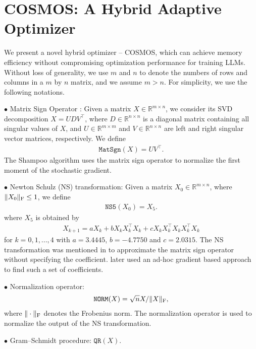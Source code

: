 \newcommand{\RR}{\mathbb{R}}
\section{COSMOS: A Hybrid Adaptive Optimizer}

We present a novel hybrid optimizer -- COSMOS, which can achieve memory efficiency without compromising optimization performance for training LLMs. Without loss of generality, we use $m$ and $n$ to denote the numbers of rows and columns in a $m$ by $n$ matrix, and we assume $m>n$. For simplicity, we use the following notations.

\vskip2pt
\noindent $\bullet$ Matrix Sign Operator \citep{roberts1980linear}: Given a matrix $X\in\RR^{m \times n}$, we consider its SVD decomposition $X=UDV^\top$, where $D\in\RR^{n\times n}$ is a diagonal matrix containing all singular values of $X$, and $U\in\RR^{m\times m}$ and $V\in\RR^{n \times n}$ are left and right singular vector matrices, respectively. We define
\begin{align*}
\texttt{MatSgn}(X) = UV^\top. 
\end{align*}
The Shampoo algorithm uses the matrix sign operator to normalize the first moment of the stochastic gradient.

\vskip2pt
\noindent $\bullet$ Newton Schulz (NS) transformation: Given a matrix $X_0\in\RR^{m \times n}$, where $\|X_0\|_{\rm F}\leq 1$, we define
\begin{align*}
\texttt{NS5}(X_0)=X_5.
\end{align*}
where $X_5$ is obtained by
\begin{align*}
X_{k+1}=aX_{k}+bX_{k}X_{k}^\top X_{k}+cX_{k}X_{k}^\top X_{k}X_{k}^\top X_{k}
\end{align*}
for $k=0,1,...,4$ with $a=3.4445$, $b=-4.7750$ and $c=2.0315$. The NS transformation was mentioned in \citet{bernstein2024modular} to approximate the matrix sign operator without specifying the coefficient. \citet{jordan2024MUON} later used an ad-hoc gradient based approach to find such a set of coefficients.

\vskip2pt
\noindent $\bullet$ Normalization operator:
\begin{align}\label{new-norm}
\texttt{NORM}(X) = \sqrt{n}X/\|X\|_{\rm F},
\end{align}
where $\|\cdot\|_{\rm F}$ denotes the Frobenius norm. The normalization operator is used to normalize the output of the NS transformation.

\vskip2pt
\noindent $\bullet$ Gram–Schmidt procedure: $\texttt{QR}(X)$.

